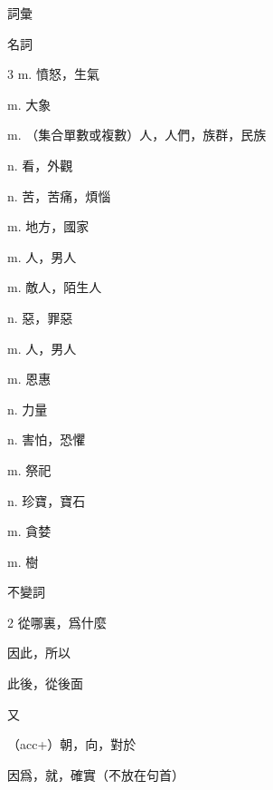 \documentclass[aspectratio=169]{beamer}
\begin{document}
\begin{frame}{詞彙}
    \begin{block}{名詞}
        \begin{VocabCols}{3}
             m. 憤怒，生氣
            
             m. 大象
            
             m. （集合單數或複數）人，人們，族群，民族
            
             n. 看，外觀
            
             n. 苦，苦痛，煩惱
            
             m. 地方，國家
            
             m. 人，男人
            
             m. 敵人，陌生人
            
             n. 惡，罪惡
            
             m. 人，男人
            
             m. 恩惠
            
             n. 力量
            
             n. 害怕，恐懼
            
             m. 祭祀
            
             n. 珍寶，寶石
            
             m. 貪婪
            
             m. 樹
        \end{VocabCols}
    \end{block}

    \begin{block}{不變詞}
        \begin{VocabCols}{2}
             從哪裏，爲什麼
            
             因此，所以
            
             此後，從後面
            
             又
            
             （acc+）朝，向，對於
            
             因爲，就，確實（不放在句首）
        \end{VocabCols}
    \end{block}
\end{frame}
\end{document}
